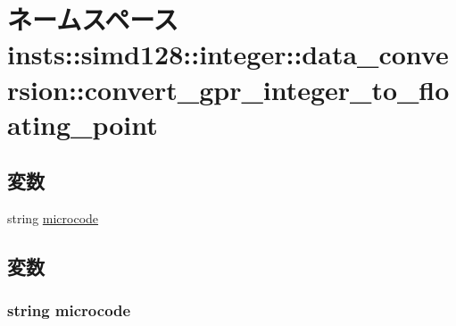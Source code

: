 \hypertarget{namespaceinsts_1_1simd128_1_1integer_1_1data__conversion_1_1convert__gpr__integer__to__floating__point}{
\section{ネームスペース insts::simd128::integer::data\_\-conversion::convert\_\-gpr\_\-integer\_\-to\_\-floating\_\-point}
\label{namespaceinsts_1_1simd128_1_1integer_1_1data__conversion_1_1convert__gpr__integer__to__floating__point}
}
\subsection*{変数}
\begin{DoxyCompactItemize}
\item 
string \hyperlink{namespaceinsts_1_1simd128_1_1integer_1_1data__conversion_1_1convert__gpr__integer__to__floating__point_a770f11a173e99389a8802f0107ed8f52}{microcode}
\end{DoxyCompactItemize}


\subsection{変数}
\hypertarget{namespaceinsts_1_1simd128_1_1integer_1_1data__conversion_1_1convert__gpr__integer__to__floating__point_a770f11a173e99389a8802f0107ed8f52}{
\subsubsection[{microcode}]{\setlength{\rightskip}{0pt plus 5cm}string {\bf microcode}}}
\label{namespaceinsts_1_1simd128_1_1integer_1_1data__conversion_1_1convert__gpr__integer__to__floating__point_a770f11a173e99389a8802f0107ed8f52}
